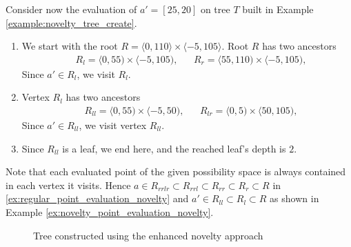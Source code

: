 \begin{example}
\label{ex:novelty_point_evaluation_novelty}
    Consider now the evaluation of $a' = [25,20]$ on tree $T$ built in Example \ref{example:novelty_tree_create}.

\begin{enumerate}
    \item  We start with the root $R = \langle 0,110\rangle \times \langle -5, 105 \rangle$.
    Root $R$ has two ancestors 
\begin{align*}
    &R_l = \langle 0,55) \times \langle -5, 105),&
    &R_r = \langle 55,110) \times \langle -5, 105),
\end{align*}
Since $a' \in R_l$, we visit $R_l$.
\item Vertex $R_l$ has two ancestors
\begin{align*}
    &R_{ll} = \langle 0,55) \times \langle -5, 50),&
    &R_{lr} = \langle 0,5) \times \langle 50, 105),
\end{align*}
Since $a' \in R_{ll}$, we visit vertex $R_{ll}$.
\item
Since $R_{ll}$ is a leaf, we end here, and the reached leaf's depth is $2$.
\end{enumerate}
\end{example}
Note that each evaluated point of the given possibility space is always contained in each vertex it visits.
Hence $a \in R_{rrlr} \subset R_{rrl} \subset R_{rr} \subset R_{r} \subset R$ in \ref{ex:regular_point_evaluation_novelty}
and $a' \in R_{ll} \subset R_{l} \subset R$ as shown in Example \ref{ex:novelty_point_evaluation_novelty}.





\begin{figure}[htbp]
\centering

\caption{Tree constructed using the enhanced novelty approach}
\label{fig:example_novelty_tree_color}
\end{figure}


